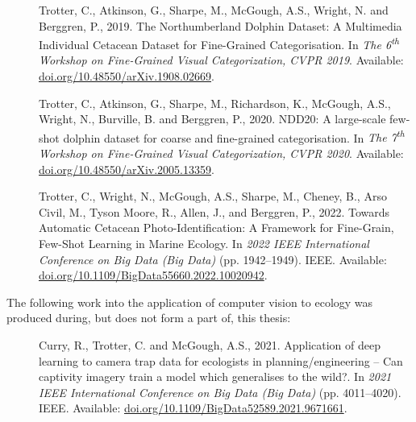 \begin{description}
	
	\item[\cite{trotter_northumberland_2019}] Trotter, C., Atkinson, G., Sharpe, M., McGough, A.S., Wright, N. and Berggren, P., 2019. The Northumberland Dolphin Dataset: A Multimedia Individual Cetacean Dataset for Fine-Grained Categorisation. In \textit{The 6\textsuperscript{th} Workshop on Fine-Grained Visual Categorization, CVPR 2019}. Available: \href{https://doi.org/10.48550/arXiv.1908.02669}{doi.org/10.48550/arXiv.1908.02669}.
	
	\item[\cite{trotter_ndd20_2020}] Trotter, C., Atkinson, G., Sharpe, M., Richardson, K., McGough, A.S., Wright, N., Burville, B. and Berggren, P., 2020. NDD20: A large-scale few-shot dolphin dataset for coarse and fine-grained categorisation. In \textit{The 7\textsuperscript{th} Workshop on Fine-Grained Visual Categorization, CVPR 2020}. Available: \href{https://doi.org/10.48550/arXiv.2005.13359}{doi.org/10.48550/arXiv.2005.13359}. 
	
	\item [\cite{trotter_towards_2022}] Trotter, C., Wright, N., McGough, A.S., Sharpe, M., Cheney, B., Arso Civil, M., Tyson Moore, R., Allen, J., and Berggren, P., 2022. Towards Automatic Cetacean Photo-Identification: A Framework for Fine-Grain, Few-Shot Learning in Marine Ecology. In \textit{2022 IEEE International Conference on Big Data (Big Data)} (pp. 1942--1949). IEEE.  Available: \href{https://doi.org/10.1109/BigData55660.2022.10020942}{doi.org/10.1109/BigData55660.2022.10020942}.
\end{description}

\noindent The following work into the application of computer vision to ecology was produced during, but does not form a part of, this thesis:

\begin{description}
	\item[\cite{curry_application_2021}] Curry, R., Trotter, C. and McGough, A.S., 2021. Application of deep learning to camera trap data for ecologists in planning/engineering – Can captivity imagery train a model which generalises to the wild?. In \textit{2021 IEEE International Conference on Big Data (Big Data)} (pp. 4011--4020). IEEE. Available: \href{	https://doi.org/10.1109/BigData52589.2021.9671661}{doi.org/10.1109/BigData52589.2021.9671661}.
\end{description}



